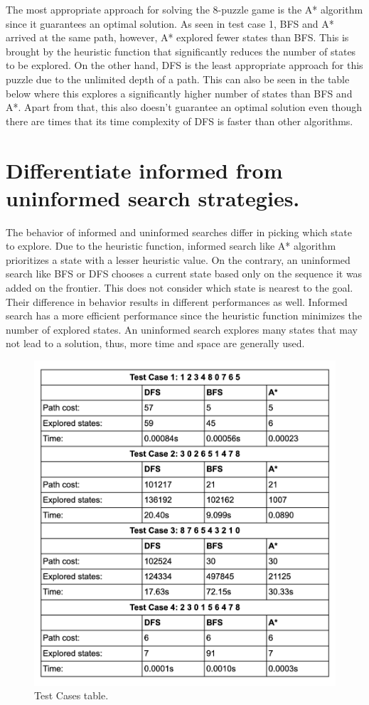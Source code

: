 \documentclass{article}
\begin{document}
The most appropriate approach for solving the 8-puzzle game is the A* algorithm since it guarantees an optimal solution. As seen in test case 1, BFS and A* arrived at the same path, however, A* explored fewer states than BFS. This is brought by the heuristic function that significantly reduces the number of states to be explored. On the other hand, DFS is the least appropriate approach for this puzzle due to the unlimited depth of a path. This can also be seen in the table below where this explores a significantly higher number of states than BFS and A*. Apart from that, this also doesn't guarantee an optimal solution even though there are times that its time complexity of DFS is faster than other algorithms.


\section{Differentiate informed from uninformed search strategies.}

The behavior of informed and uninformed searches differ in picking which state to explore. Due to the heuristic function, informed search like A* algorithm prioritizes a state with a lesser heuristic value. On the contrary, an uninformed search like BFS or DFS chooses a current state based only on the sequence it was added on the frontier. This does not consider which state is nearest to the goal. Their difference in behavior results in different performances as well. Informed search has a more efficient performance since the heuristic function minimizes the number of explored states. An uninformed search explores many states that may not lead to a solution, thus, more time and space are generally used.

\begin{figure}
\centering
\includegraphics[width=\linewidth]{table.png}
\caption{\label{fig:table}Test Cases table.}
\end{figure}
\end{document}

